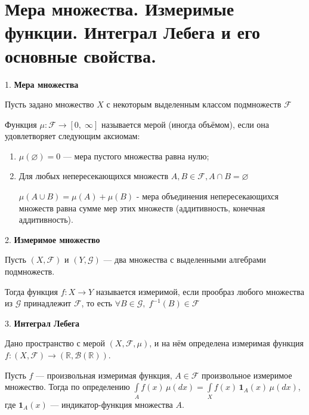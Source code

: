 \section{
    Мера множества. Измеримые функции. Интеграл Лебега и его основные свойства.
}

1. \textbf{Мера множества}

Пусть задано множество ${\displaystyle X}$ с некоторым выделенным классом подмножеств 
${\displaystyle {\mathcal {F}}}$

Функция ${\displaystyle \mu \colon {\mathcal {F}}\to [0,\;\infty ]}$ называется мерой 
(иногда объёмом), если она удовлетворяет следующим аксиомам:
\begin{enumerate}
    \item ${\displaystyle \mu (\varnothing )=0}$ — мера пустого множества равна нулю;
    \item Для любых непересекающихся множеств ${\displaystyle A,B\in {\mathcal {F}},} {\displaystyle A\cap B=\varnothing }$
    
    $\mu (A\cup B)=\mu (A)+\mu (B)$ - мера объединения непересекающихся множеств равна сумме мер этих множеств (аддитивность, конечная аддитивность).
\end{enumerate}

2. \textbf{Измеримое множество}

Пусть ${\displaystyle (X,{\mathcal {F}})}$ и 
${\displaystyle (Y,{\mathcal {G}})}$ — два множества с выделенными алгебрами подмножеств. 

Тогда функция ${\displaystyle f:X\to Y}$ называется измеримой, если прообраз любого множества из ${\displaystyle {\mathcal {G}}}$ принадлежит 
${\displaystyle {\mathcal {F}}}$, то есть
${\displaystyle \forall B\in {\mathcal {G}},\;f^{-1}(B)\in {\mathcal {F}}}$

3. \textbf{Интеграл Лебега}

Дано пространство с мерой ${\displaystyle (X,{\mathcal {F}},\mu )}$, 
и на нём определена измеримая функция ${\displaystyle f\colon (X,{\mathcal {F}})\to (\mathbb {R} ,{\mathcal {B}}(\mathbb {R} ))}$.

Пусть ${\displaystyle f}$ — произвольная измеримая функция,  $A\in {\mathcal  {F}}$ 
произвольное измеримое множество. Тогда по определению
${\displaystyle \int \limits _{A}f(x)\,\mu (dx)=\int \limits _{X}f(x)\,\mathbf {1} _{A}(x)\,\mu (dx)}$, 
где ${\displaystyle \mathbf {1} _{A}(x)}$ — индикатор-функция множества ${\displaystyle A}$.

